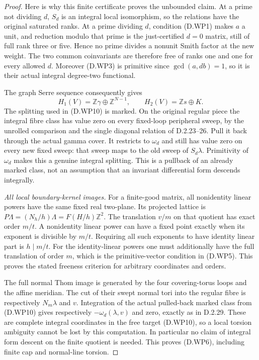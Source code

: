 \begin{proof}
Here is why this finite certificate proves the
unbounded claim. At a prime not dividing $d$,
$S_d$ is an integral local isomorphism, so the
relations have the original saturated ranks.
At a prime dividing $d$, condition (D.WP1) makes
$a$ a unit, and reduction modulo that prime is
the just-certified $d=0$ matrix, still of full
rank three or five. Hence no prime divides a
nonunit Smith factor at the new weight.
The two common coinvariants are therefore free
of ranks one and one for every allowed $d$.
Moreover (D.WP3) is primitive since
$\gcd(a,db)=1$, so it is their actual integral
degree-two functional.

The graph Serre sequence consequently gives
\[
 H_1(V)=\mathbb Z\gamma\oplus\mathbb Z^{N-1},
 \qquad H_2(V)=\mathbb Zs\oplus K.                         \tag{D.WP10}
\]
The splitting used in (D.WP10) is marked. On the
original regular piece the integral fibre class
has value zero on every fixed-loop peripheral
sweep, by the unrolled comparison and the single
diagonal relation of D.2.23--26. Pull it back
through the actual gamma cover. It restricts to
$\omega_d$ and still has value zero on every
new fixed sweep: that sweep maps to the old
sweep of $S_d\lambda$.
Primitivity of $\omega_d$ makes this a genuine
integral splitting. This is a pullback of an
already marked class, not an assumption that
an invariant differential form descends integrally.

\emph{All local boundary-kernel images.}
For a finite-good matrix, all nonidentity linear
powers have the same fixed real two-plane.
Its projected lattice is
$P\Lambda=(N_h/h)\Lambda=F(H/h)\mathbb Z^2$.
The translation $v/m$ on that quotient has exact
order $m/t$. A nonidentity linear power can have
a fixed point exactly when its exponent is
divisible by $m/t$. Requiring all such exponents
to have identity linear part is $h\mid m/t$.
For the identity-linear powers one must additionally
have the full translation of order $m$, which is
the primitive-vector condition in (D.WP5).
This proves the stated freeness criterion for
arbitrary coordinates and orders.

The full normal Thom image is generated by the
four covering-torus loops and the affine meridian.
The cut of their swept normal tori into the regular
fibre is respectively $N_m\lambda$ and $v$.
Integration of the actual pulled-back marked
class from (D.WP10) gives respectively
$-\omega_d(\lambda,v)$ and zero, exactly as in
D.2.29. These are complete integral coordinates
in the free target (D.WP10), so a local torsion
ambiguity cannot be lost by this computation.
In particular no claim of integral form descent
on the finite quotient is needed.
This proves (D.WP6), including finite cap and
normal-line torsion.


\end{proof}
